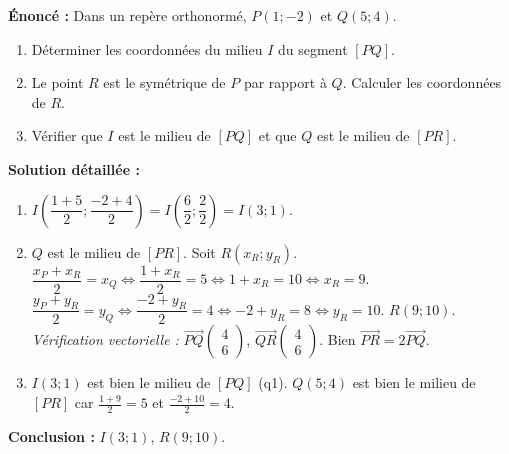 \documentclass[11pt]{article}
\begin{document}
\begin{exoresolu}
    \textbf{Énoncé :} Dans un repère orthonormé, $P(1;-2)$ et $Q(5;4)$.
    \begin{enumerate}
        \item Déterminer les coordonnées du milieu $I$ du segment $[PQ]$.
        \item Le point $R$ est le symétrique de $P$ par rapport à $Q$. Calculer les coordonnées de $R$.
        \item Vérifier que $I$ est le milieu de $[PQ]$ et que $Q$ est le milieu de $[PR]$.
    \end{enumerate}
    \tcblower
    \textbf{Solution détaillée :}
    \begin{enumerate}
        \item $I\left(\dfrac{1+5}{2};\dfrac{-2+4}{2}\right) = I\left(\dfrac{6}{2};\dfrac{2}{2}\right) = I(3;1)$.
        \item $Q$ est le milieu de $[PR]$. Soit $R(x_R;y_R)$.
        $\dfrac{x_P+x_R}{2}=x_Q \iff \dfrac{1+x_R}{2}=5 \iff 1+x_R=10 \iff x_R=9$.
        $\dfrac{y_P+y_R}{2}=y_Q \iff \dfrac{-2+y_R}{2}=4 \iff -2+y_R=8 \iff y_R=10$.
        $R(9;10)$.
        \textit{Vérification vectorielle :} $\overrightarrow{PQ}\begin{pmatrix} 4 \\ 6 \end{pmatrix}$, $\overrightarrow{QR}\begin{pmatrix} 4 \\ 6 \end{pmatrix}$. Bien $\overrightarrow{PR}=2\overrightarrow{PQ}$.
        \item $I(3;1)$ est bien le milieu de $[PQ]$ (q1). $Q(5;4)$ est bien le milieu de $[PR]$ car $\frac{1+9}{2}=5$ et $\frac{-2+10}{2}=4$.
    \end{enumerate}
    \textbf{Conclusion :} $I(3;1)$, $R(9;10)$.
\end{exoresolu}
\end{document}
